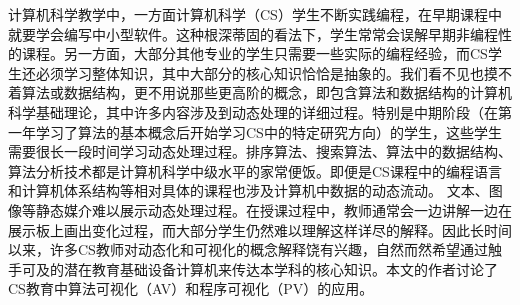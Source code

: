 
\begin{sectext}
计算机科学教学中，一方面计算机科学（CS）学生不断实践编程，在早期课程中就要学会编写中小型软件。这种根深蒂固的看法下，学生常常会误解早期非编程性的课程。另一方面，大部分其他专业的学生只需要一些实际的编程经验，而CS学生还必须学习整体知识，其中大部分的核心知识恰恰是抽象的。我们看不见也摸不着算法或数据结构，更不用说那些更高阶的概念，即包含算法和数据结构的计算机科学基础理论，其中许多内容涉及到动态处理的详细过程。特别是中期阶段（在第一年学习了算法的基本概念后开始学习CS中的特定研究方向）的学生，这些学生需要很长一段时间学习动态处理过程。排序算法、搜索算法、算法中的数据结构、算法分析技术都是计算机科学中级水平的家常便饭。即便是CS课程中的编程语言和计算机体系结构等相对具体的课程也涉及计算机中数据的动态流动。
文本、图像等静态媒介难以展示动态处理过程。在授课过程中，教师通常会一边讲解一边在展示板上画出变化过程，而大部分学生仍然难以理解这样详尽的解释。因此长时间以来，许多CS教师对动态化和可视化的概念解释饶有兴趣，自然而然希望通过触手可及的潜在教育基础设备计算机来传达本学科的核心知识。本文的作者讨论了CS教育中算法可视化（AV）和程序可视化（PV）的应用。
\end{sectext}







